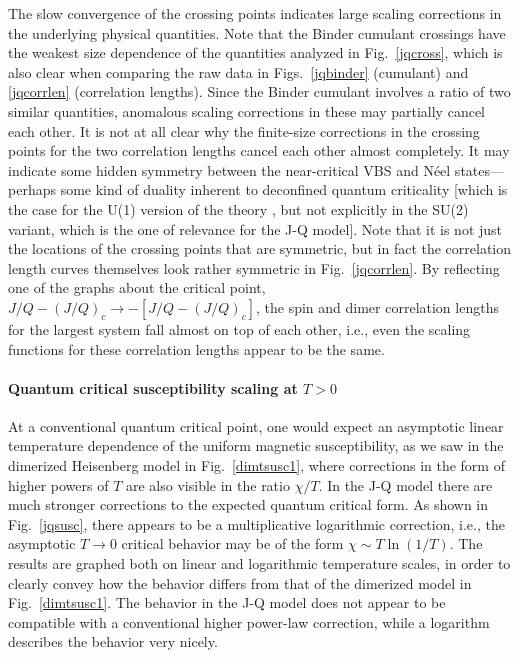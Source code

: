 \documentclass[draft,numberedheadings]{aipproc}
\begin{document}
The slow convergence of the crossing points indicates large scaling corrections in the underlying physical quantities. Note that the Binder cumulant 
crossings have the weakest size dependence of the quantities analyzed in Fig.~\ref{jqcross}, which is also clear when comparing the raw data in 
Figs.~\ref{jqbinder} (cumulant) and \ref{jqcorrlen} (correlation lengths). Since the Binder cumulant involves a ratio of two similar quantities, 
anomalous scaling corrections in these may partially cancel each other. It is not at all clear why the finite-size corrections in the crossing
points for the two correlation lengths cancel each other almost completely. It may indicate some hidden symmetry between the near-critical VBS
and N\'eel states---perhaps some kind of duality inherent to deconfined quantum criticality [which is the case for the U(1) version of the theory 
\cite{senthil1}, but not explicitly in the SU(2) variant, which is the one of relevance for the J-Q model]. Note that it is not just the locations 
of the crossing points that are symmetric, but in fact the correlation length curves themselves look rather symmetric in Fig.~\ref{jqcorrlen}. By 
reflecting one of the graphs about the critical point, $J/Q-(J/Q)_c \to -[J/Q-(J/Q)_c]$, the spin and dimer correlation lengths for the largest 
system fall almost on top of each other, i.e., even the scaling functions for these correlation lengths appear to be the same.

\paragraph{Quantum critical susceptibility scaling at $T>0$}

At a conventional quantum critical point, one would expect an asymptotic linear temperature dependence of the uniform magnetic susceptibility, as 
we saw in the dimerized Heisenberg model in Fig.~\ref{dimtsusc1}, where corrections in the form of higher powers of $T$ are also visible in
the ratio $\chi/T$. In the J-Q model there are much stronger corrections to the expected quantum critical form. As shown in Fig.~\ref{jqsusc},
there appears to be a multiplicative logarithmic correction, i.e., the asymptotic $T \to 0$ critical behavior may be of the form $\chi \sim T\ln(1/T)$.
The results are graphed both on linear and logarithmic temperature scales, in order to clearly convey how the behavior differs from that of 
the dimerized model in Fig.~\ref{dimtsusc1}. The behavior in the J-Q model does not appear to be compatible with a conventional higher power-law
correction, while a logarithm describes the behavior very nicely. 
\end{document}
